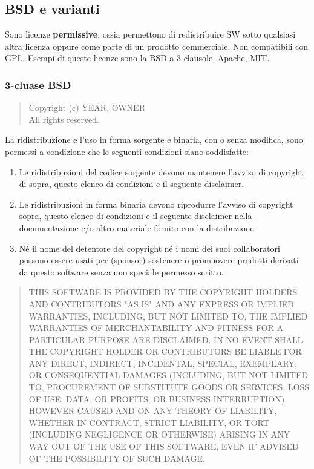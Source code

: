 \documentclass[10pt,a4paper]{book}
\begin{document}
\subsection{BSD e varianti}
Sono licenze \textbf{permissive}, ossia permettono di redistribuire SW sotto qualsiasi altra licenza oppure come parte di un prodotto commerciale. Non compatibili con GPL.
Esempi di queste licenze sono la BSD a 3 clausole, Apache, MIT.

\subsubsection{3-cluase BSD}
\begin{quote}
Copyright (c) YEAR, OWNER\\
All rights reserved.
\end{quote}

La ridistribuzione e l'uso in forma sorgente e binaria, con o senza modifica, sono permessi a condizione che le seguenti condizioni siano soddisfatte:
\begin{enumerate}
\item Le ridistribuzioni del codice sorgente devono mantenere l'avviso di copyright di sopra, questo elenco di condizioni e il seguente disclaimer.
\item Le ridistribuzioni in forma binaria devono riprodurre l'avviso di copyright sopra, questo elenco di condizioni e il seguente disclaimer nella documentazione e/o altro materiale fornito con la distribuzione.
\item Né il nome del detentore del copyright né i nomi dei suoi collaboratori possono essere usati per (sponsor) sostenere o promuovere prodotti derivati da questo software senza uno speciale permesso scritto.
\end{enumerate}

\begin{quote}
THIS SOFTWARE IS PROVIDED BY THE COPYRIGHT HOLDERS
AND CONTRIBUTORS "AS IS" AND ANY EXPRESS OR IMPLIED
WARRANTIES, INCLUDING, BUT NOT LIMITED TO, THE IMPLIED
WARRANTIES OF MERCHANTABILITY AND FITNESS FOR A
PARTICULAR PURPOSE ARE DISCLAIMED. IN NO EVENT SHALL
THE COPYRIGHT HOLDER OR CONTRIBUTORS BE LIABLE FOR
ANY DIRECT, INDIRECT, INCIDENTAL, SPECIAL, EXEMPLARY, OR
CONSEQUENTIAL DAMAGES (INCLUDING, BUT NOT LIMITED
TO, PROCUREMENT OF SUBSTITUTE GOODS OR SERVICES;
LOSS OF USE, DATA, OR PROFITS; OR BUSINESS
INTERRUPTION) HOWEVER CAUSED AND ON ANY THEORY OF
LIABILITY, WHETHER IN CONTRACT, STRICT LIABILITY, OR TORT
(INCLUDING NEGLIGENCE OR OTHERWISE) ARISING IN ANY
WAY OUT OF THE USE OF THIS SOFTWARE, EVEN IF ADVISED
OF THE POSSIBILITY OF SUCH DAMAGE.
\end{quote}
\end{document}
